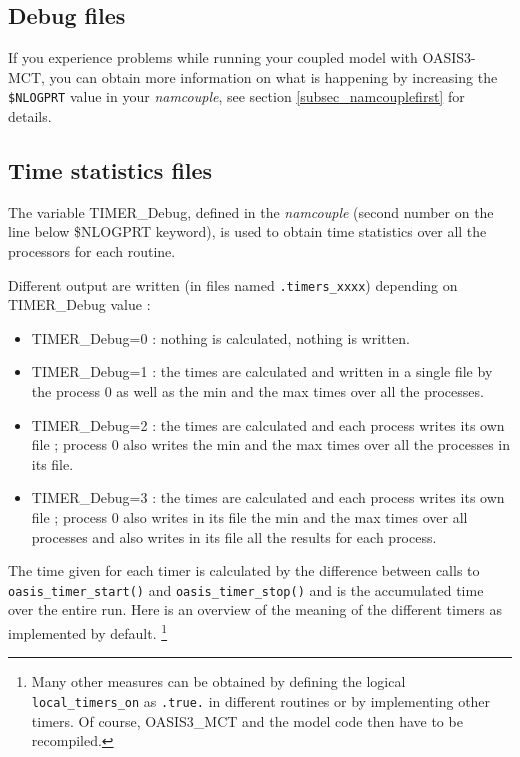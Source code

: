 \subsection{Debug files}
If you experience problems while running your coupled model with
OASIS3-MCT, you can obtain more information on what is happening by
increasing the {\tt \$NLOGPRT} value in your {\it namcouple}, see section
\ref{subsec_namcouplefirst} for details.

\subsection{Time statistics files}
\label{timestat}

The variable TIMER\_Debug, defined in the {\it namcouple} (second
number on the line below \$NLOGPRT keyword), is used to obtain time
statistics over all the processors for each routine.

Different output are written (in files named {\tt *.timers\_xxxx})
depending on TIMER\_Debug value :

\begin{itemize}
\item {TIMER\_Debug=0} : nothing is calculated, nothing is written.
\item {TIMER\_Debug=1} : the times are calculated and written in a
  single file by the process 0 as well as the min and the max times
  over all the processes.
\item {TIMER\_Debug=2} : the times are calculated and each process
  writes its own file ; process 0 also writes the min and the max
  times over all the processes in its file.
\item {TIMER\_Debug=3} : the times are calculated and each process
  writes its own file ; process 0 also writes in its file the min
  and the max times over all processes and also writes in its file
  all the results for each process.
\end{itemize}
 
The time given for each timer is calculated by the difference between
calls to {\tt oasis\_timer\_start()} and {\tt oasis\_timer\_stop()}
and is the accumulated time over the entire run. Here is an overview
of the meaning of the different timers as implemented by default.
\footnote{Many other measures can be obtained by defining the logical
{\tt local\_timers\_on} as {\tt .true.} in different routines or by
implementing other timers. Of course, OASIS3\_MCT and the model code then have to be recompiled.}

